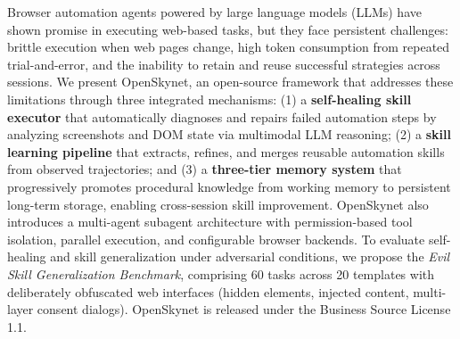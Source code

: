 Browser automation agents powered by large language models (LLMs) have shown promise in executing web-based tasks, but they face persistent challenges: brittle execution when web pages change, high token consumption from repeated trial-and-error, and the inability to retain and reuse successful strategies across sessions. We present OpenSkynet, an open-source framework that addresses these limitations through three integrated mechanisms: (1) a \textbf{self-healing skill executor} that automatically diagnoses and repairs failed automation steps by analyzing screenshots and DOM state via multimodal LLM reasoning; (2) a \textbf{skill learning pipeline} that extracts, refines, and merges reusable automation skills from observed trajectories; and (3) a \textbf{three-tier memory system} that progressively promotes procedural knowledge from working memory to persistent long-term storage, enabling cross-session skill improvement. OpenSkynet also introduces a multi-agent subagent architecture with permission-based tool isolation, parallel execution, and configurable browser backends. To evaluate self-healing and skill generalization under adversarial conditions, we propose the \emph{Evil Skill Generalization Benchmark}, comprising 60 tasks across 20 templates with deliberately obfuscated web interfaces (hidden elements, injected content, multi-layer consent dialogs). OpenSkynet is released under the Business Source License 1.1.
